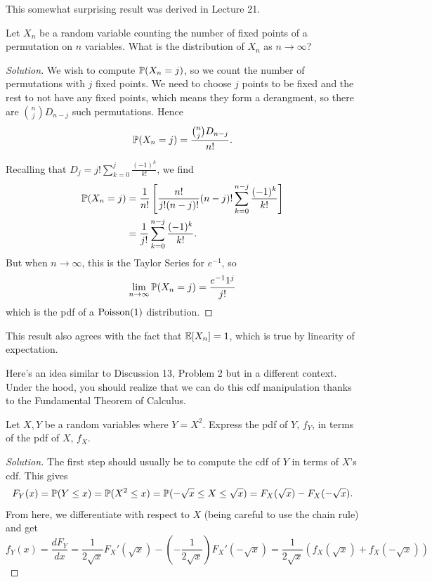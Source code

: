 \documentclass[11 pt]{scrartcl}
\begin{document}
This somewhat surprising result was derived in Lecture 21. 
\begin{example}
    Let $X_n$ be a random variable counting the number of fixed points of a permutation on $n$ variables. What is the distribution of $X_n$ as $n\to\infty$?  
\end{example}
\begin{proof}[Solution]
    We wish to compute $\mathbb P(X_n = j)$, so we count the number of permutations with $j$ fixed points. We need to choose $j$ points to be fixed and the rest to not have any fixed points, which means they form a derangment, so there are $\binom{n}{j}D_{n-j}$ such permutations. Hence 
    \[ \mathbb P(X_n = j) = \dfrac{\binom{n}{j}  D_{n-j}}{n!}.\]

    Recalling that $D_j = j!\sum_{k=0}^j \frac{(-1)^k}{k!}$, we find 
    \begin{align*}
        \mathbb P(X_n = j) &= \dfrac{1}{n!}\left[ \dfrac{n!}{j!(n-j)!} (n-j)! \sum_{k=0}^{n-j}\dfrac{(-1)^k}{k!}\right] \\ 
                     &= \dfrac{1}{j!} \sum_{k=0}^{n-j}\dfrac{(-1)^k}{k!}.
    \end{align*}
    But when $n\to\infty$, this is the Taylor Series for $e^{-1}$, so 
    \[ \lim_{n\to\infty} \mathbb P(X_n = j) = \frac{e^{-1} 1^j }{j!} \] 
    which is the pdf of a $\text{Poisson}(1)$ distribution. 
\end{proof}
This result also agrees with the fact that $\mathbb E[X_n] = 1$, which is true by linearity of expectation.  

Here's an idea similar to Discussion 13, Problem 2 but in a different context. Under the hood, you should realize that we can do this cdf manipulation thanks to the Fundamental Theorem of Calculus. 
\begin{example}
    Let $X, Y$ be a random variables where $Y = X^2$. Express the pdf of $Y$, $f_Y$, in terms of the pdf of $X$, $f_X$.   
    \label{example:ft_rv}
\end{example}
\begin{proof}[Solution]
    The first step should usually be to compute the cdf of $Y$ in terms of $X$'s cdf. This gives 
    \[ F_Y(x) = \mathbb P(Y \leq x) = \mathbb P(X^2 \leq x) = \mathbb P(-\sqrt{x} \leq X \leq \sqrt{x}) = F_X(\sqrt{x}) - F_X(-\sqrt{x}).\] 
    From here, we differentiate with respect to $X$ (being careful to use the chain rule) and get 
    \[ f_Y(x) = \dfrac{dF_Y}{dx} = \dfrac{1}{2\sqrt{x}}F_X'(\sqrt{x}) - \left(-\dfrac{1}{2\sqrt{x}}\right)F_X'(-\sqrt{x}) 
    = \dfrac{1}{2\sqrt{x}} (f_X(\sqrt{x})+f_X(-\sqrt{x})) \]

\end{proof}
\end{document}
